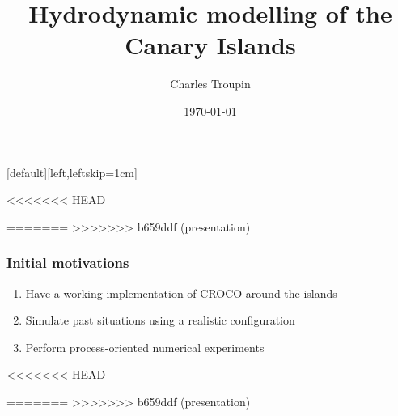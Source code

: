 
\newcommand{\listcheck}{\textcolor{DarkGreen}{\checkmark}}

\newcommand{\mycomment}[1]{\hfill\textcolor{LightGray}{(#1)}}

[default][left,leftskip=1cm] %
\newcommand{\mydoi}[1]{\textcolor{mycolor1}{\aiDoi~\href{https://doi.org/#1}{#1}}}

\title{Hydrodynamic modelling of the Canary Islands}
\subtitle{}
\author[C.~Troupin]{Charles Troupin}
\date{\today}
  

{
\begin{frame}
\maketitle
\end{frame}
}

<<<<<<< HEAD

=======
>>>>>>> b659ddf (presentation)

\begin{frame}[c]
\frametitle{Initial motivations}

\begin{enumerate}[label=\protect\mycirc{\color{white}\arabic*}]
\item Have a working implementation of CROCO around the islands
\item Simulate past situations using a realistic configuration
\item Perform process-oriented numerical experiments
\end{enumerate}

\end{frame}
<<<<<<< HEAD
 
=======
>>>>>>> b659ddf (presentation)


